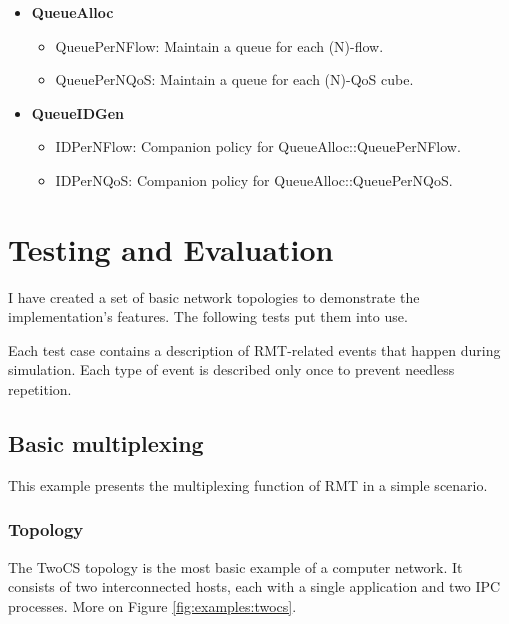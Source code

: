         \begin{itemize}
            \item \textbf{QueueAlloc}
            \begin{itemize}
                \item QueuePerNFlow: Maintain a queue for each (N)-flow.
                \item QueuePerNQoS: Maintain a queue for each (N)-QoS cube.
            \end{itemize}
            \item \textbf{QueueIDGen}
            \begin{itemize}
                \item IDPerNFlow: Companion policy for QueueAlloc::QueuePerNFlow.
                \item IDPerNQoS: Companion policy for QueueAlloc::QueuePerNQoS.
            \end{itemize}
        \end{itemize}


\chapter{Testing and Evaluation}\label{testing}

    I have created a set of basic network topologies to demonstrate the implementation's features. The following tests put them into use.

    Each test case contains a description of RMT-related events that happen during simulation. Each type of event is described only once to prevent needless repetition.


    \section{Basic multiplexing}

        This example presents the multiplexing function of RMT in a simple scenario.

        \subsection{Topology}

            The TwoCS topology is the most basic example of a computer network. It consists of two interconnected hosts, each with a single application and two IPC processes. More on Figure \ref{fig:examples:twocs}.

